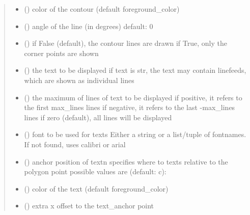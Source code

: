 \documentclass[letterpaper,10pt,english]{sphinxmanual}
\begin{document}
\begin{fulllineitems}
\begin{quote}
\begin{description}
\begin{itemize}
\item {} 
 () \textendash{} color of the contour (default foreground\_color)

\item {} 
 () \textendash{} angle of the line (in degrees) 
default: 0

\item {} 
 () \textendash{} if False (default), the contour lines are drawn 
if True, only the corner points are shown

\item {} 
 (\sphinxstyleliteralemphasis{, }) \textendash{} the text to be displayed 
if text is str, the text may contain linefeeds, which are shown as individual lines

\item {} 
 () \textendash{} the maximum of lines of text to be displayed 
if positive, it refers to the first max\_lines lines 
if negative, it refers to the last -max\_lines lines 
if zero (default), all lines will be displayed

\item {} 
 () \textendash{} font to be used for texts 
Either a string or a list/tuple of fontnames.
If not found, uses calibri or arial

\item {} 
 () \textendash{} anchor position of text\textbar{}n\textbar{}
specifies where to texts relative to the polygon
point 
possible values are (default: c): 

\item {} 
 () \textendash{} color of the text (default foreground\_color)

\item {} 
 () \textendash{} extra x offset to the text\_anchor point


\end{itemize}
\end{description}
\end{quote}
\end{fulllineitems}
\end{document}
